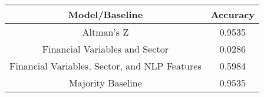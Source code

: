 \footnotesize
\begin{tabular}{cc}
\toprule
Model/Baseline & Accuracy \\
\midrule
Altman's Z & 0.9535 \\
Financial Variables and Sector & 0.0286 \\
Financial Variables, Sector, and NLP Features & 0.5984 \\
Majority Baseline & 0.9535 \\
\bottomrule
\end{tabular}

\normalsize